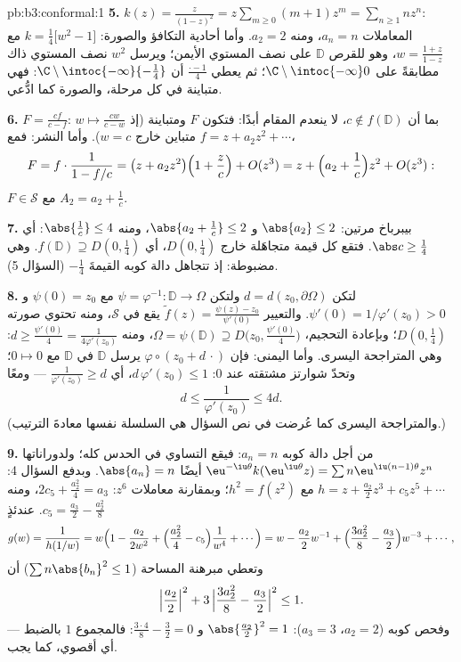 \begin{solution}{pb:b3:conformal:1}
\textbf{5.} $k(z) = \frac z{(1-z)^2} = z\sum_{m\geq0}(m +
1)z^m = \sum_{n\geq1}nz^n$: المعاملات $a_n = n$، ومنه $a_2 =
2$. وأما
أحادية التكافؤ والصورة: $k = \frac14\bigl[w^2 - 1\bigr]$ مع $w = \frac{1 + z}{1 - z}$، وهو 
للقرص $\mathbb D$ على نصف المستوي الأيمن؛ ويرسل $w^2$ نصف
المستوي ذاك مطابقةً على $\C\setminus\intoc{-\infty}0$؛ ثم يعطي $\frac{\cdot - 1}4$ أن $\C\setminus\intoc{-\infty}{-\frac14}$:
فهي متباينة في كل مرحلة، والصورة كما ادُّعي.

\textbf{6.} $F = \frac{cf}{c - f}$: بما أن $c \notin f(\mathbb
D)$، لا ينعدم المقام أبدًا:
فتكون $F$  ومتباينة (إذ $w \mapsto \frac{cw}{c - w}$  متباين
خارج $w = c$). وأما النشر: فمع $f = z + a_2z^2 + \cdots$،
\[
F = f\cdot\frac1{1 - f/c} = \bigl(z + a_2z^2\bigr)\Bigl(1 +
\frac zc\Bigr) + O(z^3)
= z + \Bigl(a_2 + \frac1c\Bigr)z^2 + O(z^3):
\]
$F \in \mathcal S$ مع $A_2 = a_2 + \frac1c$.

\textbf{7.} بيبرباخ مرتين: $\abs{a_2} \leq 2$ و $\abs{a_2 + \frac1c} \leq 2$، ومنه $\abs{\frac1c} \leq 4$:
أي $\abs c \geq \frac14$. فتقع كل قيمة متجاهَلة خارج $D(0,\frac14)$، أي
$f(\mathbb D) \supseteq D(0, \frac14)$. وهي مضبوطة: إذ تتجاهل دالة كوبه القيمةَ $-\frac14$
(السؤال 5).

\textbf{8.} لتكن $d = d(z_0, \partial\Omega)$ ولتكن $\psi =
\varphi^{-1} \colon \mathbb D \to \Omega$ مع $\psi(0) = z_0$
و $\psi'(0) = 1/\varphi'(z_0) > 0$. والتعيير $\tilde
f(z) = \frac{\psi(z) - z_0}{\psi'(0)}$ يقع في $\mathcal S$، ومنه تحتوي
صورته $D(0, \frac14)$؛ وبإعادة التحجيم، $\Omega = \psi(\mathbb D) \supseteq D\bigl(z_0,
\tfrac{\psi'(0)}4\bigr)$، ومنه $d \geq \frac{\psi'(0)}4 =
\frac1{4\varphi'(z_0)}$:
وهي المتراجحة اليسرى. وأما اليمنى: فإن $\varphi\circ(z_0 + d\,\cdot)$ يرسل $\mathbb D$
في $\mathbb D$ مع $0 \mapsto 0$؛ وتحدّ شوارتز مشتقته عند $0$:
$d\,\varphi'(z_0) \leq 1$، أي $\frac1{\varphi'(z_0)} \geq d$ --- ومعًا
\[
d \leq \frac1{\varphi'(z_0)} \leq 4d .
\]
(والمتراجحة اليسرى كما عُرضت في نص السؤال هي السلسلة نفسها
معادةَ الترتيب.)

\textbf{9.} من أجل دالة كوبه $a_n = n$: فيقع التساوي في الحدس
كله؛ ولدوراناتها $\eu^{-\iu\theta}k(\eu^{\iu\theta}z) = \sum
n\eu^{\iu(n-1)\theta}z^n$ أيضًا $\abs{a_n} = n$. وبدفع السؤال 4:
$h = z + \frac{a_2}2z^3 + c_5z^5 + \cdots$ مع $h^2 = f(z^2)$؛ وبمقارنة معاملات $z^6$: $2c_5 +
\frac{a_2^2}4 = a_3$،
ومنه $c_5 = \frac{a_3}2 -
\frac{a_2^2}8$. عندئذٍ
\[
g(w) = \frac1{h(1/w)} = w\Bigl(1 - \frac{a_2}{2w^2} +
\Bigl(\frac{a_2^2}4 - c_5\Bigr)\frac1{w^4} + \cdots\Bigr)
= w - \frac{a_2}2w^{-1} + \Bigl(\frac{3a_2^2}8 -
\frac{a_3}2\Bigr)w^{-3} + \cdots,
\]
وتعطي مبرهنة المساحة ($\sum n\abs{b_n}^2 \leq 1$) أن
\[
\Bigl|\frac{a_2}2\Bigr|^2 + 3\,\Bigl|\frac{3a_2^2}8 -
\frac{a_3}2\Bigr|^2 \leq 1 .
\]
وفحص كوبه ($a_2 = 2$، $a_3 = 3$): $\abs{\frac{a_2}2}^2 = 1$ و $\frac{3\cdot4}8 - \frac32 = 0$: فالمجموع
$1$ بالضبط --- أي أقصوي، كما يجب.


\end{solution}
